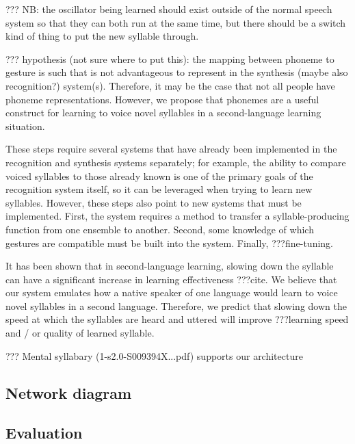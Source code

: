 ??? NB: the oscillator being learned should exist outside of
the normal speech system so that they can both run
at the same time, but there should be a switch kind of thing
to put the new syllable through.

??? hypothesis (not sure where to put this):
the mapping between phoneme to gesture
is such that is not advantageous
to represent in the synthesis
(maybe also recognition?) system(s).
Therefore, it may be the case that
not all people have phoneme representations.
However, we propose that phonemes
are a useful construct for learning to voice
novel syllables in a second-language learning situation.

These steps require several systems
that have already been implemented
in the recognition and synthesis systems separately;
for example, the ability to compare
voiced syllables to those already known
is one of the primary goals of the recognition system itself,
so it can be leveraged when trying to learn new syllables.
However, these steps also point to new systems
that must be implemented.
First, the system requires a method
to transfer a syllable-producing function
from one ensemble to another.
Second, some knowledge of which gestures
are compatible must be built into the system.
Finally, ???fine-tuning.

It has been shown that in second-language learning,
slowing down the syllable can have
a significant increase in learning effectiveness
???cite.
We believe that our system emulates
how a native speaker of one language
would learn to voice novel syllables in a second language.
Therefore, we predict that slowing down
the speed at which the syllables are heard
and uttered will improve ???learning speed
and / or quality of learned syllable.

??? Mental syllabary (1-s2.0-S009394X...pdf)
supports our architecture

\subsection{Network diagram}

\subsection{Evaluation}
